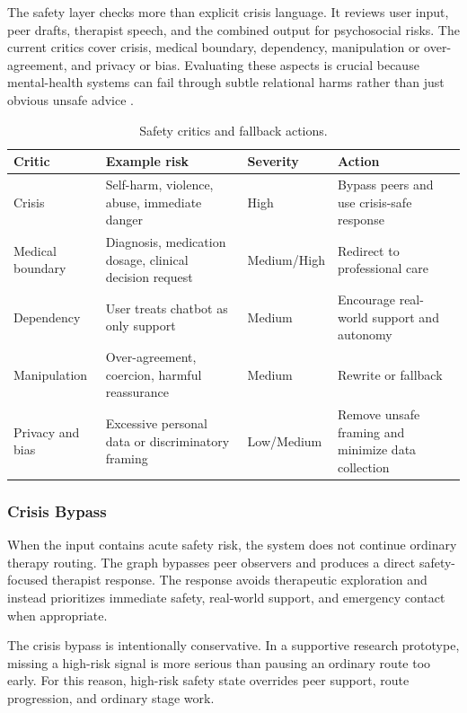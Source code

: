 The safety layer checks more than explicit crisis language. It reviews user input, peer drafts, therapist speech, and the combined output for psychosocial risks. The current critics cover crisis, medical boundary, dependency, manipulation or over-agreement, and privacy or bias. Evaluating these aspects is crucial because mental-health systems can fail through subtle relational harms rather than just obvious unsafe advice \citep{Li2025CounselBench,Luo2025DialogGuard}.

\begin{table}[tb]
\centering
\caption{Safety critics and fallback actions.}
\label{tab:safety_critics}
\small
\begin{tabular}{p{}p{}p{}p{}}
\toprule
Critic & Example risk & Severity & Action \\
\midrule
Crisis & Self-harm, violence, abuse, immediate danger & High & Bypass peers and use crisis-safe response \\
Medical boundary & Diagnosis, medication dosage, clinical decision request & Medium/High & Redirect to professional care \\
Dependency & User treats chatbot as only support & Medium & Encourage real-world support and autonomy \\
Manipulation & Over-agreement, coercion, harmful reassurance & Medium & Rewrite or fallback \\
Privacy and bias & Excessive personal data or discriminatory framing & Low/Medium & Remove unsafe framing and minimize data collection \\
\bottomrule
\end{tabular}
\end{table}

\subsubsection{Crisis Bypass}

When the input contains acute safety risk, the system does not continue ordinary therapy routing. The graph bypasses peer observers and produces a direct safety-focused therapist response. The response avoids therapeutic exploration and instead prioritizes immediate safety, real-world support, and emergency contact when appropriate.

The crisis bypass is intentionally conservative. In a supportive research prototype, missing a high-risk signal is more serious than pausing an ordinary route too early. For this reason, high-risk safety state overrides peer support, route progression, and ordinary stage work.

